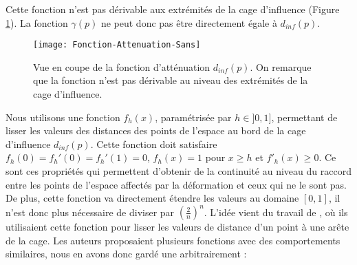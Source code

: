 \begin{center}
\end{center}

Cette fonction n'est pas dérivable aux extrémités de la cage d'influence
(Figure \ref{MELAtN}). La fonction $\gamma(p)$ ne peut donc pas être
directement égale à $d_{inf}(p)$.

\begin{figure}[ht]
\begin{center}
\texttt{[image: Fonction-Attenuation-Sans]}

\caption[Fonction d'atténuation $d_{inf}(p)$] {Vue en coupe de la fonction
d'atténuation $d_{inf}(p)$. On remarque que la fonction n'est pas
dérivable au niveau des extrémités de la cage d'influence.}

\label{MELAtN}

\end{center}
\end{figure}

Nous utilisons une fonction $f_h(x)$, paramétrisée par $h \in ]0, 1]$,
permettant de lisser les valeurs des distances des points de l'espace au bord
de la cage d'influence $d_{inf}(p)$. Cette fonction doit satisfaire $f_h(0) =
f_h'(0) = f_h'(1) = 0$, $f_h(x)=1$ pour $x \geq h$ et $f'_h(x) \geq 0$. Ce
sont ces propriétés qui permettent d'obtenir de la continuité au niveau du
raccord entre les points de l'espace affectés par la déformation et ceux qui
ne le sont pas. De plus, cette fonction va directement étendre les valeurs au
domaine $[0,1]$, il n'est donc plus nécessaire de diviser par
$(\frac{2}{n})^n$. L'idée vient du travail de \cite{GPCP13}, où ils
utilisaient cette fonction pour lisser les valeurs de distance d'un point à
une arête de la cage. Les auteurs proposaient plusieurs fonctions avec des
comportements similaires, nous en avons donc gardé une arbitrairement :

